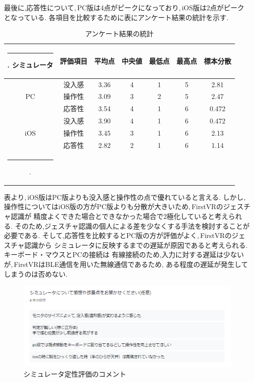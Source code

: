 \documentclass{ltjsreport}
\makeatletter
\def\Hline{
  \noalign{\ifnum0=`}\fi\hrule \@height 3.\arrayrulewidth \futurelet
  \reserved@a\@xhline}
\makeatother
\begin{document}
		最後に,応答性について,\,PC版は4点がピークになっており,\,iOS版は2点がピークとなっている.
\clearpage
		各項目を比較するために表にアンケート結果の統計を示す.
		\begin{table}[H]
		\begin{center}
		\caption{アンケート結果の統計}
		\label{tab:resoult}
		\begin{tabular}{cc|ccccc} \Hline
		シミュレータ&評価項目&平均点&中央値&最低点&最高点&標本分散\\ \hline
		&没入感&3.36&4&1&5&2.81\\
		PC&操作性&3.09&3&2&5&2.47\\
		&応答性&3.54&4&1&6&0.472\\ \hline
		&没入感&3.90&4&1&6&0.472\\
		iOS&操作性&3.45&3&1&6&2.13\\
		&応答性&2.82&2&1&6&1.14\\ \Hline
		\end{tabular}
		\end{center}
		\end{table}
		表より,\,iOS版はPC版よりも没入感と操作性の点で優れていると言える.
		しかし,操作性についてはiOS版の方がPC版よりも分散が大きいため,\,FirstVRのジェスチャ認識が
		精度よくできた場合とできなかった場合で2極化していると考えられる.
		そのため,ジェスチャ認識の個人による差を少なくする手法を検討することが必要である.
		そして,応答性を比較するとPC版の方が評価がよく,\,FirstVRのジェスチャ認識から
		シミュレータに反映するまでの遅延が原因であると考えられる.キーボード・マウスとPCの接続は
		有線接続のため,入力に対する遅延は少ないが,\,FirstVRはBLE通信を用いた無線通信であるため,
		ある程度の遅延が発生してしまうのは否めない.

		\begin{figure}[H]
		\centering
		\includegraphics[width = 12cm]{../figs/result.png}
		\caption{シミュレータ定性評価のコメント}
		\label{fig:comment}
		\end{figure}
		\vspace{-15pt}
		
\end{document}
